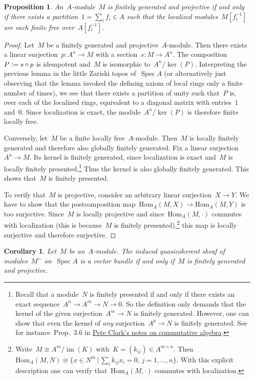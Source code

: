 \documentclass[12pt]{scrartcl}
\theoremstyle{definition}
\theoremstyle{plain}
\newtheorem*{prop}{Proposition}
\newtheorem*{cor}{Corollary}
\theoremstyle{remark}
\newcommand{\defeq}{\vcentcolon=}
\newcommand{\Hom}{\mathrm{Hom}}
\begin{document}
\begin{prop}An~$A$-module~$M$ is finitely generated and projective if and only
if there exists a partition~$1 = \sum_i f_i \in A$ such that the localized
modules~$M[f_i^{-1}]$ are each finite free over~$A[f_i^{-1}]$.\end{prop}

\begin{proof}Let~$M$ be a finitely generated and projective~$A$-module. Then
there exists a linear surjection~$p : A^n \to M$ with a section~$s : M \to
A^n$. The composition~$P \defeq s \circ p$ is idempotent and~$M$ is isomorphic
to~$A^n/\operatorname{ker}(P)$. Interpreting the previous lemma in the little
Zariski topos of~$\operatorname{Spec} A$ (or alternatively just observing that
the lemma invoked the defining axiom of local rings only a finite number of
times), we see that there exists a partition
of unity such that~$P$ is, over each of the localized rings, equivalent to a
diagonal matrix with entries~$1$ and~$0$. Since localization is exact, the
module~$A^n/\operatorname{ker}(P)$ is therefore finite locally free.

Conversely, let~$M$ be a finite locally free~$A$-module. Then~$M$ is locally
finitely generated and therefore also globally finitely generated. Fix a linear
surjection~$A^n \to M$. Its kernel is finitely generated, since localization is
exact and~$M$ is locally finitely presented.\footnote{Recall that a module~$N$ is finitely
presented if and only if there exists an exact sequence~$A^n \to A^m \to N \to
0$. So the definition only demands that the kernel of the given surjection~$A^m \to
N$ is finitely generated. However, one can show that even the kernel of \emph{any}
surjection~$A^p \to N$ is finitely generated. See for instance~Prop.~3.6 in
\href{http://math.uga.edu/~pete/integral.pdf}{Pete Clark's notes on commutative
algebra}.}
Thus the kernel is also globally
finitely generated. This shows that~$M$ is finitely presented.

To verify that~$M$ is projective, consider an arbitrary linear surjection~$X
\to Y$. We have to show that the postcomposition map~$\Hom_A(M,X) \to
\Hom_A(M,Y)$ is too surjective. Since~$M$ is locally projective and
since~$\Hom_A(M,\cdot)$ commutes with localization (this is because~$M$ is finitely
presented),\footnote{Write~$M \cong A^m/\operatorname{im}(K)$ with~$K = (k_{ij})
\in A^{m \times n}$. Then~$\Hom_A(M,N)
\cong \{ x \in N^m \,|\, \sum_i k_{ij} x_i = 0,\, j = 1,\ldots,n \}$. With this
explicit description one can verify that~$\Hom_A(M,\cdot)$ commutes with
localization.} this map is locally surjective and therefore surjective.
\end{proof}

\begin{cor}Let~$M$ be an~$A$-module. The induced quasicoherent sheaf of
modules~$M^\sim$ on~$\operatorname{Spec} A$ is a vector bundle if and only
if~$M$ is finitely generated and projective.\end{cor}
\end{document}
